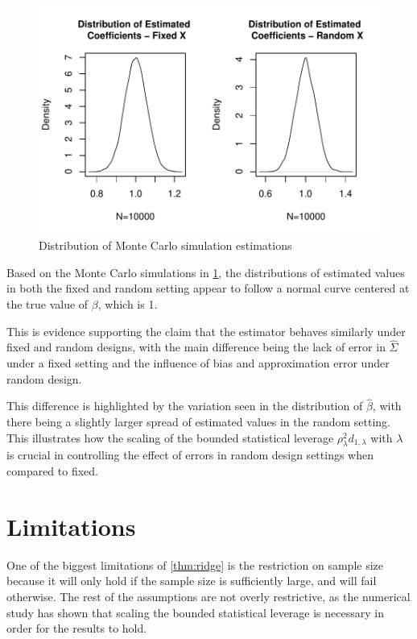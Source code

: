 \documentclass[nohyperref]{article}
\theoremstyle{plain}
\theoremstyle{definition}
\theoremstyle{remark}
\begin{document}
\begin{figure}[!h]
\begin{center}
\centerline{\includegraphics[width=\columnwidth]{montecarlo10000.pdf}}
\caption{Distribution of Monte Carlo simulation estimations}
\label{montecarlo10000}
\end{center}
\vskip -0.2in
\end{figure}

Based on the Monte Carlo simulations in \cref{montecarlo10000}, the distributions of estimated values in both the fixed and random setting appear to follow a normal curve centered at the true value of $\beta$, which is 1. 

This is evidence supporting the claim that the estimator behaves similarly under fixed and random designs, with the main difference being the lack of error in $\hat{\Sigma}$ under a fixed setting and the influence of bias and approximation error under random design. 

This difference is highlighted by the variation seen in the distribution of $\hat{\beta}$, with there being a slightly larger spread of estimated values in the random setting. This illustrates how the scaling of the bounded statistical leverage $\rho_\lambda^2d_{1,\lambda}$ with $\lambda$ is crucial in controlling the effect of errors in random design settings when compared to fixed.
\cite{HKZ2014}


\section{Limitations}
One of the biggest limitations of \cref{thm:ridge} is the restriction on sample size because it will only hold if the sample size is sufficiently large, and will fail otherwise. The rest of the assumptions are not overly restrictive, as the numerical study has shown that scaling the bounded statistical leverage is necessary in order for the results to hold. 
\end{document}
